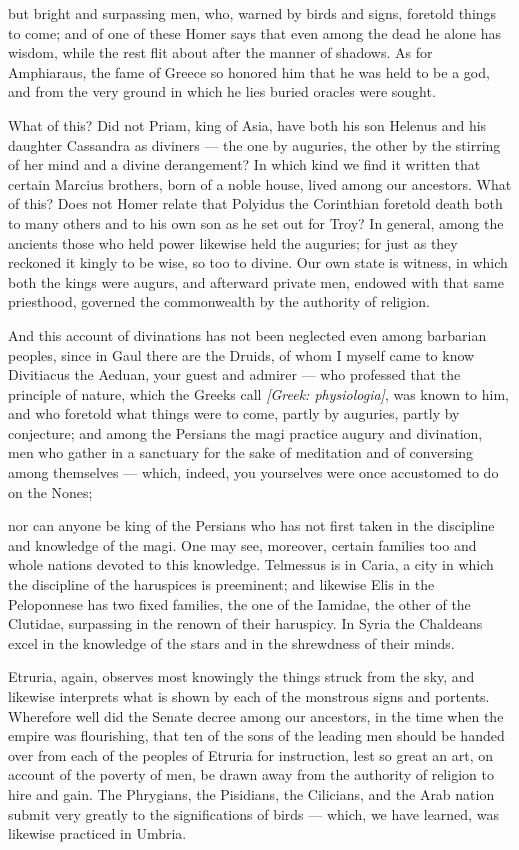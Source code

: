 but bright and surpassing men, who, warned by birds and signs, foretold things to come; and of one of these Homer says that even among the dead he alone has wisdom, while the rest flit about after the manner of shadows. As for Amphiaraus, the fame of Greece so honored him that he was held to be a god, and from the very ground in which he lies buried oracles were sought.

 What of this? Did not Priam, king of Asia, have both his son Helenus and his daughter Cassandra as diviners — the one by auguries, the other by the stirring of her mind and a divine derangement? In which kind we find it written that certain Marcius brothers, born of a noble house, lived among our ancestors. What of this? Does not Homer relate that Polyidus the Corinthian foretold death both to many others and to his own son as he set out for Troy? In general, among the ancients those who held power likewise held the auguries; for just as they reckoned it kingly to be wise, so too to divine. Our own state is witness, in which both the kings were augurs, and afterward private men, endowed with that same priesthood, governed the commonwealth by the authority of religion.

 And this account of divinations has not been neglected even among barbarian peoples, since in Gaul there are the Druids, of whom I myself came to know Divitiacus the Aeduan, your guest and admirer — who professed that the principle of nature, which the Greeks call \textit{[Greek: physiologia]}, was known to him, and who foretold what things were to come, partly by auguries, partly by conjecture; and among the Persians the magi practice augury and divination, men who gather in a sanctuary for the sake of meditation and of conversing among themselves — which, indeed, you yourselves were once accustomed to do on the Nones;

 nor can anyone be king of the Persians who has not first taken in the discipline and knowledge of the magi. One may see, moreover, certain families too and whole nations devoted to this knowledge. Telmessus is in Caria, a city in which the discipline of the haruspices is preeminent; and likewise Elis in the Peloponnese has two fixed families, the one of the Iamidae, the other of the Clutidae, surpassing in the renown of their haruspicy. In Syria the Chaldeans excel in the knowledge of the stars and in the shrewdness of their minds.

 Etruria, again, observes most knowingly the things struck from the sky, and likewise interprets what is shown by each of the monstrous signs and portents. Wherefore well did the Senate decree among our ancestors, in the time when the empire was flourishing, that ten of the sons of the leading men should be handed over from each of the peoples of Etruria for instruction, lest so great an art, on account of the poverty of men, be drawn away from the authority of religion to hire and gain. The Phrygians, the Pisidians, the Cilicians, and the Arab nation submit very greatly to the significations of birds — which, we have learned, was likewise practiced in Umbria.

